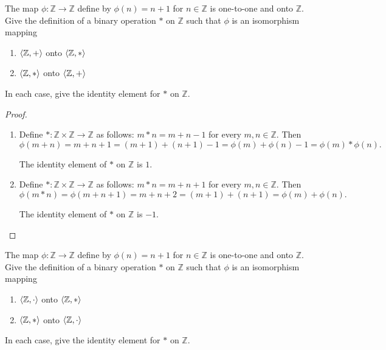 \begin{exercise}
    The map $\phi: \mathbb{Z} \to \mathbb{Z}$ define by $\phi(n) = n + 1$ for $n\in\mathbb{Z}$ is one-to-one and onto $\mathbb{Z}$. Give the definition of a binary operation $*$ on $\mathbb{Z}$ such that $\phi$ is an isomorphism mapping
    \begin{enumerate}[label={\textbf{\alph*}},itemsep=0pt,topsep=0pt]
        \item $\left\langle{\mathbb{Z}, +}\right\rangle$ onto $\left\langle{\mathbb{Z}, *}\right\rangle$
        \item $\left\langle{\mathbb{Z}, *}\right\rangle$ onto $\left\langle{\mathbb{Z}, +}\right\rangle$
    \end{enumerate}

    In each case, give the identity element for $*$ on $\mathbb{Z}$.
\end{exercise}

\begin{proof}
    \begin{enumerate}[label={\textbf{\alph*}},itemsep=0pt,topsep=0pt]
        \item Define $*: \mathbb{Z}\times\mathbb{Z}\to\mathbb{Z}$ as follows: $m * n = m + n - 1$ for every $m, n\in\mathbb{Z}$. Then
              \[
                  \phi(m + n) = m + n + 1 = (m + 1) + (n + 1) - 1 = \phi(m) + \phi(n) - 1 = \phi(m) * \phi(n).
              \]

              The identity element of $*$ on $\mathbb{Z}$ is $1$.
        \item Define $*: \mathbb{Z}\times\mathbb{Z}\to\mathbb{Z}$ as follows: $m * n = m + n + 1$ for every $m, n\in\mathbb{Z}$. Then
              \[
                  \phi(m * n) = \phi(m + n + 1) = m + n + 2 = (m + 1) + (n + 1) = \phi(m) + \phi(n).
              \]

              The identity element of $*$ on $\mathbb{Z}$ is $-1$.
    \end{enumerate}
\end{proof}

\begin{exercise}
    The map $\phi: \mathbb{Z} \to \mathbb{Z}$ define by $\phi(n) = n + 1$ for $n\in\mathbb{Z}$ is one-to-one and onto $\mathbb{Z}$. Give the definition of a binary operation $*$ on $\mathbb{Z}$ such that $\phi$ is an isomorphism mapping
    \begin{enumerate}[label={\textbf{\alph*}},itemsep=0pt,topsep=0pt]
        \item $\left\langle{\mathbb{Z}, \cdot}\right\rangle$ onto $\left\langle{\mathbb{Z}, *}\right\rangle$
        \item $\left\langle{\mathbb{Z}, *}\right\rangle$ onto $\left\langle{\mathbb{Z}, \cdot}\right\rangle$
    \end{enumerate}

    In each case, give the identity element for $*$ on $\mathbb{Z}$.
\end{exercise}

